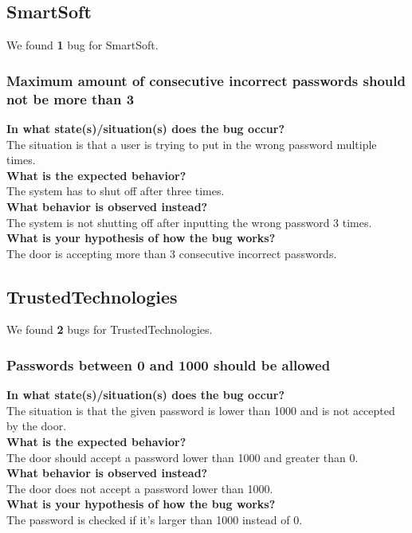 \documentclass{uva-inf-article}
\begin{document}
\subsection{SmartSoft}
We found \textbf{1} bug for SmartSoft.

\subsubsection{Maximum amount of consecutive incorrect passwords should not be more than 3}
\textbf{In what state(s)/situation(s) does the bug occur?}\\
The situation is that a user is trying to put in the wrong password multiple times.\\
\textbf{What is the expected behavior?}\\
The system has to shut off after three times.\\
\textbf{What behavior is observed instead?}\\
The system is not shutting off after inputting the wrong password 3 times.\\
\textbf{What is your hypothesis of how the bug works?}\\
The door is accepting more than 3 consecutive incorrect passwords.

\newpage

\subsection{TrustedTechnologies}
We found \textbf{2} bugs for TrustedTechnologies.

\subsubsection{Passwords between 0 and 1000 should be allowed}
\textbf{In what state(s)/situation(s) does the bug occur?}\\
The situation is that the given password is lower than 1000 and is not accepted by the door.\\
\textbf{What is the expected behavior?}\\
The door should accept a password lower than 1000 and greater than 0.\\
\textbf{What behavior is observed instead?}\\
The door does not accept a password lower than 1000.\\
\textbf{What is your hypothesis of how the bug works?}\\
The password is checked if it’s larger than 1000 instead of 0.
\end{document}
